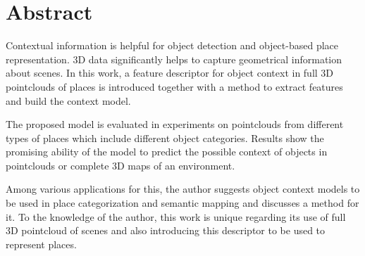 \cleardoublepage
{}
{}
\chapter*{Abstract}
Contextual information is helpful for object detection and object-based place
representation. 3D data significantly helps to capture geometrical information
about scenes. In this work, a feature descriptor for object context in full 3D
pointclouds of places is introduced together with a method to extract features
and build the context model. 


The proposed model is evaluated in experiments on pointclouds from different types of places which include different object
categories. Results show the promising ability of the model to predict the possible context of objects in pointclouds or complete 3D maps of an environment.

Among various applications for this, the author suggests object context models to be used in place categorization and semantic mapping and discusses a
method for it. To the knowledge of the author, this work is unique regarding
its use of full 3D pointcloud of scenes and also introducing this descriptor to
be used to represent places.
